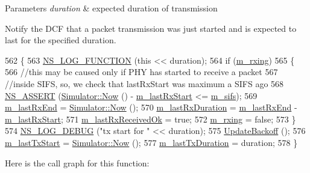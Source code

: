 \begin{DoxyParams}{Parameters}
{\em duration} & expected duration of transmission\\
\hline
\end{DoxyParams}
Notify the D\+CF that a packet transmission was just started and is expected to last for the specified duration. 
\begin{DoxyCode}
562 \{
563   \hyperlink{log-macros-disabled_8h_a90b90d5bad1f39cb1b64923ea94c0761}{NS\_LOG\_FUNCTION} (\textcolor{keyword}{this} << duration);
564   \textcolor{keywordflow}{if} (\hyperlink{classns3_1_1DcfManager_a4826eeefd00a05de3377987c4ce71969}{m\_rxing})
565     \{
566       \textcolor{comment}{//this may be caused only if PHY has started to receive a packet}
567       \textcolor{comment}{//inside SIFS, so, we check that lastRxStart was maximum a SIFS ago}
568       \hyperlink{assert_8h_a6dccdb0de9b252f60088ce281c49d052}{NS\_ASSERT} (\hyperlink{classns3_1_1Simulator_ac3178fa975b419f7875e7105be122800}{Simulator::Now} () - \hyperlink{classns3_1_1DcfManager_ab89f6e56efb993905d97ba7e28f6cc36}{m\_lastRxStart} <= 
      \hyperlink{classns3_1_1DcfManager_a1b062fb95502cbd176d76985c8254f35}{m\_sifs});
569       \hyperlink{classns3_1_1DcfManager_aeb45605e9f45e17ec4dac9e7a5e99430}{m\_lastRxEnd} = \hyperlink{classns3_1_1Simulator_ac3178fa975b419f7875e7105be122800}{Simulator::Now} ();
570       \hyperlink{classns3_1_1DcfManager_ab43fe243e604d9b329ccffdfbbba6499}{m\_lastRxDuration} = \hyperlink{classns3_1_1DcfManager_aeb45605e9f45e17ec4dac9e7a5e99430}{m\_lastRxEnd} - \hyperlink{classns3_1_1DcfManager_ab89f6e56efb993905d97ba7e28f6cc36}{m\_lastRxStart};
571       \hyperlink{classns3_1_1DcfManager_ac94f6ec6413a342a8aa2119421ed131f}{m\_lastRxReceivedOk} = \textcolor{keyword}{true};
572       \hyperlink{classns3_1_1DcfManager_a4826eeefd00a05de3377987c4ce71969}{m\_rxing} = \textcolor{keyword}{false};
573     \}
574   \hyperlink{group__logging_ga413f1886406d49f59a6a0a89b77b4d0a}{NS\_LOG\_DEBUG} (\textcolor{stringliteral}{"tx start for "} << duration);
575   \hyperlink{classns3_1_1DcfManager_a8fb01b9608eeab857a38935045fd98b8}{UpdateBackoff} ();
576   \hyperlink{classns3_1_1DcfManager_abaae67a660545bd187548f4cc349b8fd}{m\_lastTxStart} = \hyperlink{classns3_1_1Simulator_ac3178fa975b419f7875e7105be122800}{Simulator::Now} ();
577   \hyperlink{classns3_1_1DcfManager_ac64d741d745e0cc4930e58a0cee5be31}{m\_lastTxDuration} = duration;
578 \}
\end{DoxyCode}


Here is the call graph for this function\+:




